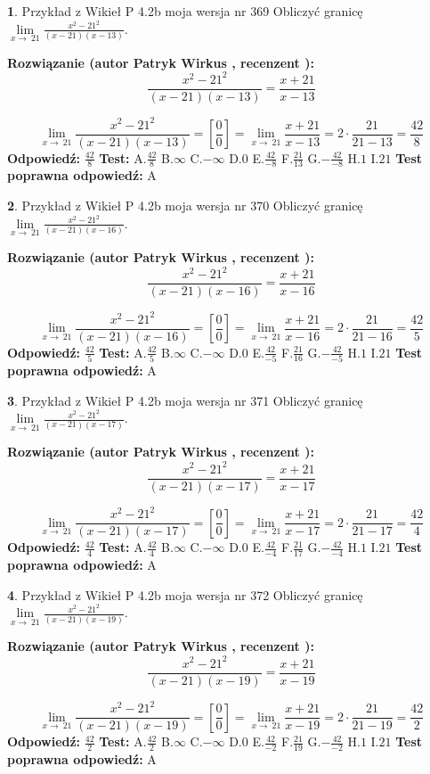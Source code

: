 \documentclass[12pt, a4paper]{article}
\theoremstyle{definition} %
\newtheorem{zad}{}
\newcommand{\zadStart}[1]{\begin{zad}#1\newline}
\newcommand{\zadStop}{\end{zad}}
\newcommand{\rozwStart}[2]{\noindent \textbf{Rozwiązanie (autor #1 , recenzent #2): }\newline}
\newcommand{\rozwStop}{\newline}
\newcommand{\odpStart}{\noindent \textbf{Odpowiedź:}\newline}
\newcommand{\odpStop}{\newline}
\newcommand{\testStart}{\noindent \textbf{Test:}\newline}
\newcommand{\testStop}{\newline}
\newcommand{\kluczStart}{\noindent \textbf{Test poprawna odpowiedź:}\newline}
\newcommand{\kluczStop}{\newline}
\begin{document}
\zadStart{Przykład z Wikieł P 4.2b moja wersja nr 369}
Obliczyć granicę $\lim\limits_{x\to\ 21}\frac{x^{2}-21^{2}}{(x-21)(x-13)}$.
\zadStop
\rozwStart{Patryk Wirkus}{}
$$\frac{x^{2}-21^{2}}{(x-21)(x-13)}=\frac{x+21}{x-13}$$

$$\lim\limits_{x\to\ 21}\frac{x^{2}-21^{2}}{(x-21)(x-13)}=[\frac{0}{0}]=\lim\limits_{x\to\ 21}\frac{x+21}{x-13}=2 \cdot \frac{21}{21-13} = \frac{42}{8}$$
\rozwStop
\odpStart
$\frac{42}{8}$
\odpStop
\testStart
A.$\frac{42}{8}$
B.$\infty$
C.$-\infty$
D.$0$
E.$\frac{42}{-8}$
F.$\frac{21}{13}$
G.$-\frac{42}{-8}$
H.$1$
I.$21$
\testStop
\kluczStart
A
\kluczStop



\zadStart{Przykład z Wikieł P 4.2b moja wersja nr 370}
Obliczyć granicę $\lim\limits_{x\to\ 21}\frac{x^{2}-21^{2}}{(x-21)(x-16)}$.
\zadStop
\rozwStart{Patryk Wirkus}{}
$$\frac{x^{2}-21^{2}}{(x-21)(x-16)}=\frac{x+21}{x-16}$$

$$\lim\limits_{x\to\ 21}\frac{x^{2}-21^{2}}{(x-21)(x-16)}=[\frac{0}{0}]=\lim\limits_{x\to\ 21}\frac{x+21}{x-16}=2 \cdot \frac{21}{21-16} = \frac{42}{5}$$
\rozwStop
\odpStart
$\frac{42}{5}$
\odpStop
\testStart
A.$\frac{42}{5}$
B.$\infty$
C.$-\infty$
D.$0$
E.$\frac{42}{-5}$
F.$\frac{21}{16}$
G.$-\frac{42}{-5}$
H.$1$
I.$21$
\testStop
\kluczStart
A
\kluczStop



\zadStart{Przykład z Wikieł P 4.2b moja wersja nr 371}
Obliczyć granicę $\lim\limits_{x\to\ 21}\frac{x^{2}-21^{2}}{(x-21)(x-17)}$.
\zadStop
\rozwStart{Patryk Wirkus}{}
$$\frac{x^{2}-21^{2}}{(x-21)(x-17)}=\frac{x+21}{x-17}$$

$$\lim\limits_{x\to\ 21}\frac{x^{2}-21^{2}}{(x-21)(x-17)}=[\frac{0}{0}]=\lim\limits_{x\to\ 21}\frac{x+21}{x-17}=2 \cdot \frac{21}{21-17} = \frac{42}{4}$$
\rozwStop
\odpStart
$\frac{42}{4}$
\odpStop
\testStart
A.$\frac{42}{4}$
B.$\infty$
C.$-\infty$
D.$0$
E.$\frac{42}{-4}$
F.$\frac{21}{17}$
G.$-\frac{42}{-4}$
H.$1$
I.$21$
\testStop
\kluczStart
A
\kluczStop



\zadStart{Przykład z Wikieł P 4.2b moja wersja nr 372}
Obliczyć granicę $\lim\limits_{x\to\ 21}\frac{x^{2}-21^{2}}{(x-21)(x-19)}$.
\zadStop
\rozwStart{Patryk Wirkus}{}
$$\frac{x^{2}-21^{2}}{(x-21)(x-19)}=\frac{x+21}{x-19}$$

$$\lim\limits_{x\to\ 21}\frac{x^{2}-21^{2}}{(x-21)(x-19)}=[\frac{0}{0}]=\lim\limits_{x\to\ 21}\frac{x+21}{x-19}=2 \cdot \frac{21}{21-19} = \frac{42}{2}$$
\rozwStop
\odpStart
$\frac{42}{2}$
\odpStop
\testStart
A.$\frac{42}{2}$
B.$\infty$
C.$-\infty$
D.$0$
E.$\frac{42}{-2}$
F.$\frac{21}{19}$
G.$-\frac{42}{-2}$
H.$1$
I.$21$
\testStop
\kluczStart
A
\kluczStop
\end{document}
